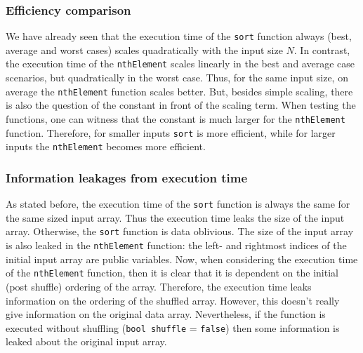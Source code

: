 \documentclass[11pt]{article}
\newcommand{\ct}[1]{\texttt{#1}}
\begin{document}

\subsubsection{Efficiency comparison} %
\label{ssub:efficiency_comparison}


We have already seen that the execution time of the \ct{sort} function always (best, average and worst cases) scales quadratically with the input size $N$. In contrast, the execution time of the \ct{nthElement} scales linearly in the best and average case scenarios, but quadratically in the worst case. Thus, for the same input size, on average the \ct{nthElement} function scales better. But, besides simple scaling, there is also the question of the constant in front of the scaling term. When testing the functions, one can witness that the constant is much larger for the \ct{nthElement} function. Therefore, for smaller inputs \ct{sort} is more efficient, while for larger inputs the \ct{nthElement} becomes more efficient.      

\subsubsection{Information leakages from execution time} %
\label{ssub:information_leakages_from_execution_time}

As stated before, the execution time of the \ct{sort} function is always the same for the same sized input array. Thus the execution time leaks the size of the input array. Otherwise, the \ct{sort} function is data oblivious. The size of the input array is also leaked in the \ct{nthElement} function: the left- and rightmost indices of the initial input array are public variables. Now, when considering the execution time of the \ct{nthElement} function, then it is clear that it is dependent on the initial (post shuffle) ordering of the array. Therefore, the execution time leaks information on the ordering of the shuffled array. However, this doesn't really give information on the original data array. Nevertheless, if the function is executed without shuffling (\ct{bool shuffle} = \ct{false}) then some information is leaked about the original input array.
\end{document}
